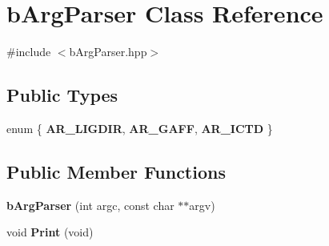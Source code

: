 \hypertarget{classbArgParser}{}\section{b\+Arg\+Parser Class Reference}
\label{classbArgParser}


{\ttfamily \#include $<$b\+Arg\+Parser.\+hpp$>$}

\subsection*{Public Types}
\begin{DoxyCompactItemize}
\item 
enum \{ {\bfseries A\+R\+\_\+\+L\+I\+G\+D\+IR}, 
{\bfseries A\+R\+\_\+\+G\+A\+FF}, 
{\bfseries A\+R\+\_\+\+I\+C\+TD}
 \}\hypertarget{classbArgParser_a056368260109e1fd1f62563fee5a908c}{}\label{classbArgParser_a056368260109e1fd1f62563fee5a908c}

\end{DoxyCompactItemize}
\subsection*{Public Member Functions}
\begin{DoxyCompactItemize}
\item 
{\bfseries b\+Arg\+Parser} (int argc, const char $\ast$$\ast$argv)\hypertarget{classbArgParser_a30d2a3f26dfb3632aa68b314955385c3}{}\label{classbArgParser_a30d2a3f26dfb3632aa68b314955385c3}

\item 
void {\bfseries Print} (void)\hypertarget{classbArgParser_ade060fb35d5828d57513674c27e7bfd8}{}\label{classbArgParser_ade060fb35d5828d57513674c27e7bfd8}

\end{DoxyCompactItemize}
